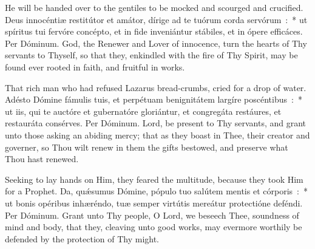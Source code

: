 {{  

  
  {He will be handed over to the gentiles to be mocked and scourged and crucified.}
  {Deus innocéntiæ restitútor et amátor, dírige ad te tuórum corda servórum~:~* ut spíritus tui fervóre concépto, et in fide inveniántur stábiles, et in ópere efficáces. Per Dóminum.}
  {God, the Renewer and Lover of innocence, turn the hearts of Thy servants to Thyself, so that they, enkindled with the fire of Thy Spirit, may be found ever rooted in faith, and fruitful in works.}

  {That rich man who had refused Lazarus bread-crumbs, cried for a drop of water.}
  {Adésto Dómine fámulis tuis, et perpétuam benignitátem largíre poscéntibus~:~* ut iis, qui te auctóre et gubernatóre gloriántur, et congregáta restáures, et restauráta consérves. Per Dóminum.}
  {Lord, be present to Thy servants, and grant unto those asking an abiding mercy; that as they boast in Thee, their creator and governer, so Thou wilt renew in them the gifts bestowed, and preserve what Thou hast renewed.}

  {Seeking to lay hands on Him, they feared the multitude, because they took Him for a Prophet.}
  {Da, quǽsumus Dómine, pópulo tuo salútem mentis et córporis~:~* ut bonis opéribus inhæréndo, tuæ semper virtútis mereátur protectióne deféndi. Per Dóminum.}
  {Grant unto Thy people, O Lord, we beseech Thee, soundness of mind and body, that they, cleaving unto good works, may evermore worthily be defended by the protection of Thy might.}

}}
